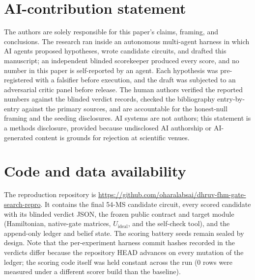 \documentclass[11pt]{article}
\begin{document}
\section{AI-contribution statement}
\label{sec:ai}

The authors are solely responsible for this paper's claims, framing, and
conclusions. The research ran inside an autonomous multi-agent harness in which
AI agents proposed hypotheses, wrote candidate circuits, and drafted this manuscript;
an independent blinded scorekeeper produced every score, and no number in this paper
is self-reported by an agent. Each hypothesis was pre-registered with a falsifier
before execution, and the draft was subjected to an adversarial critic panel before
release. The human authors verified the reported numbers against the blinded verdict
records, checked the bibliography entry-by-entry against the primary sources, and are
accountable for the honest-null framing and the seeding disclosures. AI systems are
not authors; this statement is a methods disclosure, provided because undisclosed AI
authorship or AI-generated content is grounds for rejection at scientific venues.

\section{Code and data availability}
\label{sec:code}

The reproduction repository is
\url{https://github.com/oharalabsai/dhruv-fhm-gate-search-repro}. It contains the
final 54-MS candidate circuit, every scored candidate with its blinded verdict JSON,
the frozen public contract and target module (Hamiltonian, native-gate matrices,
$U_{\mathrm{ideal}}$, and the self-check tool), and the append-only ledger and belief
state. The scoring battery seeds remain sealed by design. Note that the per-experiment
harness commit hashes recorded in the verdicts differ because the repository HEAD
advances on every mutation of the ledger; the scoring code itself was held constant
across the run (0 rows were measured under a different scorer build than the
baseline).



\end{document}
